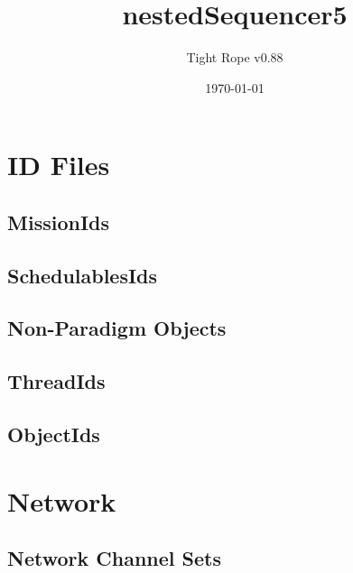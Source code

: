 \documentclass[10pt,a4paper]{article}
\title{nestedSequencer5}
\author{Tight Rope v0.88}
\date{\today}
\begin{document}
\maketitle

\section{ID Files}
\subsection{MissionIds}

\newpage

\subsection{SchedulablesIds}

\newpage

\subsection{Non-Paradigm Objects}
\newpage

\subsection{ThreadIds}

\newpage

\subsection{ObjectIds}

\newpage

\section{Network}
\subsection{Network Channel Sets}




{}
\end{document}
